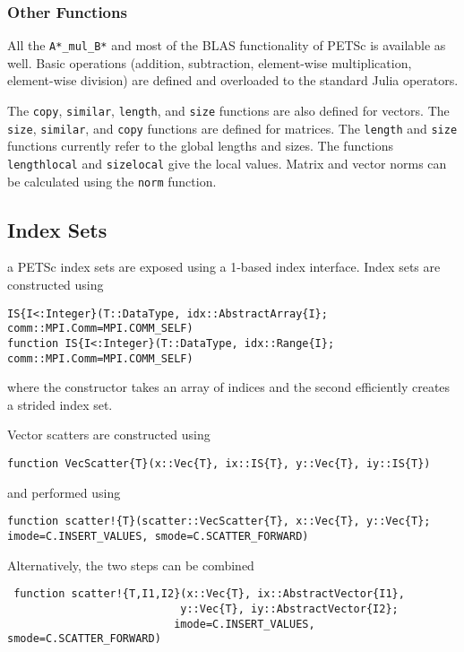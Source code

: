 \documentclass{article}
\newcommand{\ttt}{\texttt}
\begin{document}
\subsubsection{Other Functions}
All the \ttt{A*\_mul\_B*} and most of the BLAS functionality of PETSc is available as well.
Basic operations (addition, subtraction, element-wise multiplication, element-wise division) are defined and overloaded to the standard Julia operators.

The \ttt{copy}, \ttt{similar}, \ttt{length}, and \ttt{size} functions are also defined for vectors.
The \ttt{size}, \ttt{similar}, and \ttt{copy} functions are defined for matrices.
The \ttt{length} and \ttt{size} functions currently refer to the global lengths and sizes.
The functions \ttt{lengthlocal} and \ttt{sizelocal} give the local values.
Matrix and vector norms can be calculated using the \ttt{norm} function.


\subsection{Index Sets} \label{sec:is}a
PETSc index sets are exposed using a 1-based index interface.
Index sets are constructed using

\begin{verbatim}
IS{I<:Integer}(T::DataType, idx::AbstractArray{I}; comm::MPI.Comm=MPI.COMM_SELF)
function IS{I<:Integer}(T::DataType, idx::Range{I}; comm::MPI.Comm=MPI.COMM_SELF)
\end{verbatim}

where the constructor takes an array of indices and the second efficiently creates a strided index set.

Vector scatters are constructed using

\begin{verbatim}
function VecScatter{T}(x::Vec{T}, ix::IS{T}, y::Vec{T}, iy::IS{T})
\end{verbatim}

and performed using

\begin{verbatim}
function scatter!{T}(scatter::VecScatter{T}, x::Vec{T}, y::Vec{T}; imode=C.INSERT_VALUES, smode=C.SCATTER_FORWARD)
\end{verbatim}

Alternatively, the two steps can be combined
\begin{verbatim}
 function scatter!{T,I1,I2}(x::Vec{T}, ix::AbstractVector{I1},
                           y::Vec{T}, iy::AbstractVector{I2};
                          imode=C.INSERT_VALUES, smode=C.SCATTER_FORWARD)
\end{verbatim}
\end{document}
